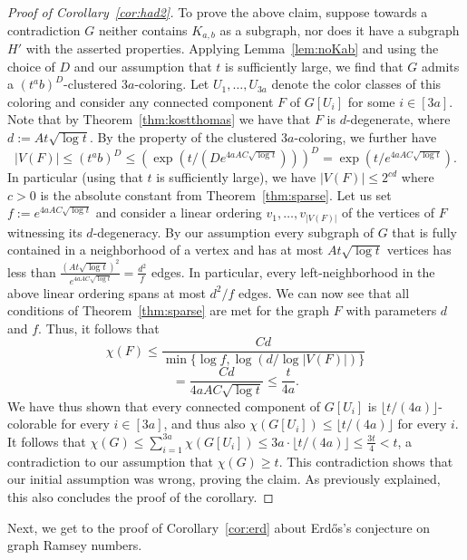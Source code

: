 \documentclass[10pt]{amsart}
\theoremstyle{definition}
\begin{document}
\begin{proof}[Proof of Corollary~\ref{cor:had2}]
To prove the above claim, suppose towards a contradiction $G$ neither contains $K_{a,b}$ as a subgraph, nor does it have a subgraph $H'$ with the asserted properties. Applying Lemma~\ref{lem:noKab} and using the choice of $D$ and our assumption that $t$ is sufficiently large, we find that $G$ admits a $(t^ab)^D$-clustered $3a$-coloring. Let $U_1,\ldots,U_{3a}$ denote the color classes of this coloring and consider any connected component $F$ of $G[U_i]$ for some $i\in [3a]$. Note that by Theorem~\ref{thm:kostthomas} we have that $F$ is $d$-degenerate, where $d:= At\sqrt{\log t}$. By the property of the clustered $3a$-coloring, we further have 
$$|V(F)|\le (t^ab)^D\le \left(\exp(t/(De^{4aAC\sqrt{\log t}}))\right)^D=\exp(t/e^{4aAC\sqrt{\log t}}).$$ 
In particular (using that $t$ is sufficiently large), we have $|V(F)|\le 2^{cd}$ where $c>0$ is the absolute constant from Theorem~\ref{thm:sparse}. Let us set $f:=e^{4aAC\sqrt{\log t}}$ and consider a linear ordering $v_1,\ldots,v_{|V(F)|}$ of the vertices of $F$ witnessing its $d$-degeneracy. By our assumption every subgraph of $G$ that is fully contained in a neighborhood of a vertex and has at most $At\sqrt{\log t}$ vertices has less than $\frac{ (At\sqrt{\log t})^2}{e^{4aAC\sqrt{\log t}}}=\frac{d^2}{f}$ edges. In particular, every left-neighborhood in the above linear ordering spans at most $d^2/f$ edges. We can now see that all conditions of Theorem~\ref{thm:sparse} are met for the graph $F$ with parameters $d$ and $f$. Thus, it follows that 
$$\chi(F)\le \frac{Cd}{\min\{\log f,\log(d/\log |V(F)|)\}}$$
$$=\frac{Cd}{4aAC\sqrt{\log t}}\le \frac{t}{4a}.$$ We have thus shown that every connected component of $G[U_i]$ is $\lfloor t/(4a)\rfloor$-colorable for every $i\in [3a]$, and thus also $\chi(G[U_i])\le \lfloor t/(4a)\rfloor$ for every $i$. It follows that $\chi(G)\le \sum_{i=1}^{3a}\chi(G[U_i])\le 3a\cdot \lfloor t/(4a)\rfloor\le \frac{3t}{4}<t$, a contradiction to our assumption that $\chi(G)\ge t$. This contradiction shows that our initial assumption was wrong, proving the claim. As previously explained, this also concludes the proof of the corollary.
\end{proof}
Next, we get to the proof of Corollary~\ref{cor:erd} about Erd\H{o}s's conjecture on graph Ramsey numbers. 
\end{document}
